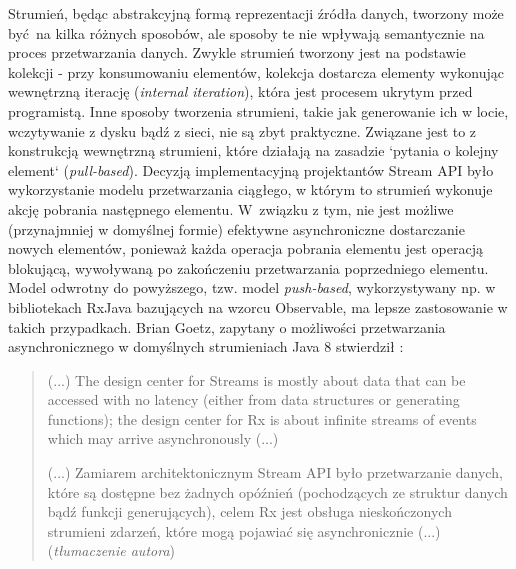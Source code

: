 \documentclass[12pt,twoside,openright]{extarticle}
\begin{document}
    Strumień, będąc abstrakcyjną formą reprezentacji źródła danych, tworzony może być na kilka różnych sposobów, ale sposoby te nie wpływają semantycznie na proces przetwarzania danych. Zwykle strumień tworzony jest na podstawie kolekcji - przy konsumowaniu elementów, kolekcja dostarcza elementy wykonując wewnętrzną iterację (\textit{internal iteration}), która jest procesem ukrytym przed programistą. Inne sposoby tworzenia strumieni, takie jak generowanie ich w locie, wczytywanie z dysku bądź z sieci, nie są zbyt praktyczne. Związane jest to z konstrukcją wewnętrzną strumieni, które działają na zasadzie `pytania o kolejny element` (\textit{pull-based}). Decyzją implementacyjną projektantów Stream API było wykorzystanie modelu przetwarzania ciągłego, w którym to strumień wykonuje akcję pobrania następnego elementu. W~związku z tym, nie jest możliwe (przynajmniej w domyślnej formie) efektywne asynchroniczne dostarczanie nowych elementów, ponieważ każda operacja pobrania elementu jest operacją blokującą, wywoływaną po zakończeniu przetwarzania poprzedniego elementu. Model odwrotny do powyższego, tzw. model \textit{push-based}, wykorzystywany np. w bibliotekach RxJava bazujących na wzorcu Observable, ma lepsze zastosowanie w takich przypadkach. Brian Goetz, zapytany o możliwości przetwarzania asynchronicznego w domyślnych strumieniach Java 8 stwierdził \cite{goetz}:

\begin{quote}
    (...) The design center for Streams is mostly about data that can be accessed with no latency (either from data structures or generating functions); the design center for Rx is about infinite streams of events which may arrive asynchronously (...)

    (...) Zamiarem architektonicznym Stream API było przetwarzanie danych, które są dostępne bez żadnych opóźnień (pochodzących ze struktur danych bądź funkcji generujących), celem Rx jest obsługa nieskończonych strumieni zdarzeń, które mogą pojawiać się asynchronicznie (...) (\textit{tłumaczenie autora})

\end{quote}
\end{document}
